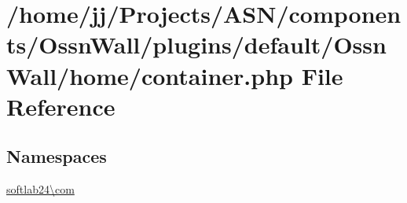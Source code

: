 \hypertarget{_ossn_wall_2home_2container_8php}{}\section{/home/jj/\+Projects/\+A\+S\+N/components/\+Ossn\+Wall/plugins/default/\+Ossn\+Wall/home/container.php File Reference}
\label{_ossn_wall_2home_2container_8php}
\subsection*{Namespaces}
\begin{DoxyCompactItemize}
\item 
 \hyperlink{namespacesoftlab24_1_1com}{softlab24\textbackslash{}com}
\end{DoxyCompactItemize}

